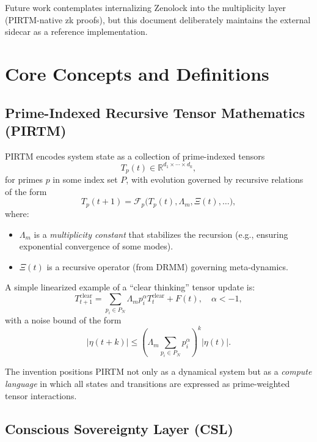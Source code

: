 \documentclass[11pt]{article}
\begin{document}
Future work contemplates internalizing Zenolock into the multiplicity layer (PIRTM-native zk proofs),
but this document deliberately maintains the external sidecar as a reference implementation.

\section{Core Concepts and Definitions}

\subsection{Prime-Indexed Recursive Tensor Mathematics (PIRTM)}

PIRTM encodes system state as a collection of prime-indexed tensors
\[
  T_{p}(t) \in \mathbb{R}^{d_1 \times \cdots \times d_k},
\]
for primes $p$ in some index set $P$, with evolution governed by recursive relations of the form
\[
  T_p(t+1) = \mathcal{F}_p\bigl(T_p(t), \Lambda_m, \Xi(t), \dots\bigr),
\]
where:
\begin{itemize}[leftmargin=*]
  \item $\Lambda_m$ is a \emph{multiplicity constant} that stabilizes the recursion (e.g., ensuring exponential convergence of some modes).
  \item $\Xi(t)$ is a recursive operator (from DRMM) governing meta-dynamics.
\end{itemize}

A simple linearized example of a ``clear thinking'' tensor update is:
\begin{equation}
  T^{\mathrm{clear}}_{t+1}
    = \sum_{p_i \in P_N} \Lambda_m p_i^{\alpha} T_t^{\mathrm{clear}} + F(t),
  \quad \alpha < -1,
  \label{eq:clear-thinking}
\end{equation}
with a noise bound of the form
\begin{equation}
  \lvert \eta(t+k) \rvert \le
  \left( \Lambda_m \sum_{p_i \in P_N} p_i^{\alpha} \right)^k \lvert \eta(t) \rvert.
\end{equation}

The invention positions PIRTM not only as a dynamical system but as a \emph{compute language} in which all states and transitions are expressed as prime-weighted tensor interactions.

\subsection{Conscious Sovereignty Layer (CSL)}
\end{document}

